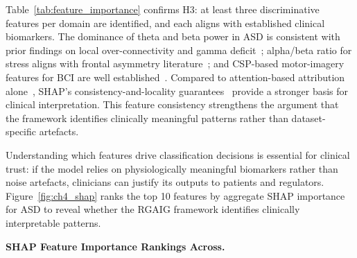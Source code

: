 \noindent Table~\ref{tab:feature_importance} confirms H3: at least three discriminative features per domain are identified, and each aligns with established clinical biomarkers. The dominance of theta and beta power in ASD is consistent with prior findings on local over-connectivity and gamma deficit~\cite{duffy2019eeg, bosl2018eeg}; alpha/beta ratio for stress aligns with frontal asymmetry literature~\cite{alshargie2018mental, jebelli2018eeg}; and CSP-based motor-imagery features for BCI are well established~\cite{blankertz2007bci, lawhern2018eegnet}. Compared to attention-based attribution alone~\cite{ribeiro2016lime}, SHAP's consistency-and-locality guarantees~\cite{lundberg2017shap} provide a stronger basis for clinical interpretation. This feature consistency strengthens the argument that the framework identifies clinically meaningful patterns rather than dataset-specific artefacts.

Understanding which features drive classification decisions is essential for clinical trust: if the model relies on physiologically meaningful biomarkers rather than noise artefacts, clinicians can justify its outputs to patients and regulators. Figure~\ref{fig:ch4_shap} ranks the top 10 features by aggregate SHAP importance for ASD to reveal whether the RGAIG framework identifies clinically interpretable patterns.

\noindent\textbf{SHAP Feature Importance Rankings Across.}


